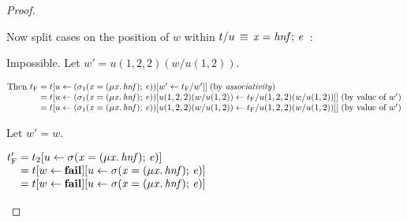 \begin{proof}
\begin{description}
    Now split cases on the position of $w$ within $t/u \mathrel{\,\equiv\,} \mathit{x}\mathrel{=}\mathit{hnf};\,\mathit{e}$~:
    \begin{description}
       Impossible. 
       Let $w'=u(1,2,2)(w/u(1,2))$.
        \par$\begin{array}{@{}l@{\;}l@{\;}l@{}}
 \text{Then $\tjoin$} & = & \tsubst{t}{u}{\tsubst{(\sigma_1(\ensuremath{\Varid{x}\mathrel{=}(\mu\Varid{x}.\,\mathit{hnf});\,\Varid{e}}))}{w'}{\tjoin/w'}} \BY{\emph{associativity}} \\
      & = & \tsubst{t}{u}{\tsubst{(\sigma_1(\ensuremath{\Varid{x}\mathrel{=}(\mu\Varid{x}.\,\mathit{hnf});\,\Varid{e}}))}{u(1,2,2)(w/u(1,2))}{\tjoin/u(1,2,2)(w/u(1,2))}} \BY{value of $w'$} \\
      & = & \tsubst{t}{u}{\tsubst{(\sigma_1(\ensuremath{\Varid{x}\mathrel{=}(\mu\Varid{x}.\,\mathit{hnf});\,\Varid{e}}))}{u(1,2,2)(w/u(1,2))}{\tjoin/u(1,2,2)(w/u(1,2))}} \BY{value of $w'$} \\
     \end{array}$


       Let $w'=w$.
    \end{description}

    \par$\begin{array}{@{}l@{\;}l@{\;}l@{}}
    \tjoin' & = & \tsubst{t_2}{u}{\sigma(\ensuremath{\Varid{x}\mathrel{=}(\mu\Varid{x}.\,\mathit{hnf});\,\Varid{e}})} \\
    & = & \tsubst{\tsubst{t}{w}{\ensuremath{\textbf{fail}}}}{u}{\sigma(\ensuremath{\Varid{x}\mathrel{=}(\mu\Varid{x}.\,\mathit{hnf});\,\Varid{e}})} \\
    & = & \tsubst{\tsubst{t}{w}{\ensuremath{\textbf{fail}}}}{u}{\sigma(\ensuremath{\Varid{x}\mathrel{=}(\mu\Varid{x}.\,\mathit{hnf});\,\Varid{e}})}
\end{array}$


  \end{description}
\end{proof}

